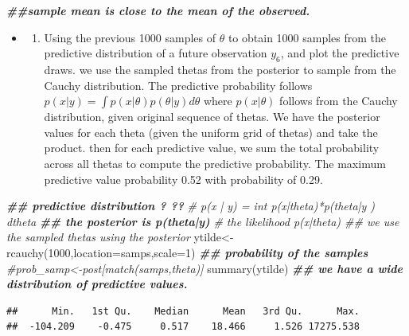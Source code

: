\documentclass[
]{book}
\newenvironment{Shaded}{\begin{snugshade}}{\end{snugshade}}
\newcommand{\AttributeTok}[1]{\textcolor[rgb]{0.77,0.63,0.00}{#1}}
\newcommand{\CommentTok}[1]{\textcolor[rgb]{0.56,0.35,0.01}{\textit{#1}}}
\newcommand{\DecValTok}[1]{\textcolor[rgb]{0.00,0.00,0.81}{#1}}
\newcommand{\DocumentationTok}[1]{\textcolor[rgb]{0.56,0.35,0.01}{\textbf{\textit{#1}}}}
\newcommand{\FunctionTok}[1]{\textcolor[rgb]{0.00,0.00,0.00}{#1}}
\newcommand{\NormalTok}[1]{#1}
\newcommand{\OtherTok}[1]{\textcolor[rgb]{0.56,0.35,0.01}{#1}}
\providecommand{\tightlist}{%
  \setlength{\itemsep}{0pt}\setlength{\parskip}{0pt}}
\theoremstyle{definition}
\theoremstyle{definition}
\theoremstyle{definition}
\theoremstyle{definition}
\theoremstyle{remark}
\begin{document}
\begin{Shaded}
\begin{Highlighting}[]
  \DocumentationTok{\#\#sample mean is close to the mean of the observed.}
\end{Highlighting}
\end{Shaded}

\begin{itemize}
\item
  \begin{enumerate}
  \def\labelenumi{(\alph{enumi})}
  \setcounter{enumi}{2}
  \tightlist
  \item
    Using the previous 1000 samples of \(\theta\) to obtain 1000 samples from the predictive distribution of a future observation \(y_6\), and plot the predictive draws.
    we use the sampled thetas from the posterior to sample from the Cauchy distribution. The predictive probability follows \(p(x|y) =\int p(x|\theta)p(\theta|y)d\theta\) where \(p(x|\theta)\) follows from the Cauchy distribution, given original sequence of thetas. We have the posterior values for each theta (given the uniform grid of thetas) and take the product. then for each predictive value, we sum the total probability across all thetas to compute the predictive probability. The maximum predictive value probability 0.52 with probability of 0.29.
  \end{enumerate}
\end{itemize}

\begin{Shaded}
\begin{Highlighting}[]
\DocumentationTok{\#\# predictive distribution ? ?? }
 \CommentTok{\# p(x | y) = int p(x|theta)*p(theta|y ) dtheta}
\DocumentationTok{\#\# the posterior is p(theta|y) }
 \CommentTok{\# the likelihood p(x|theta)  \#\# we use the sampled thetas using the posterior}
\NormalTok{ ytilde}\OtherTok{\textless{}{-}}\FunctionTok{rcauchy}\NormalTok{(}\DecValTok{1000}\NormalTok{,}\AttributeTok{location=}\NormalTok{samps,}\AttributeTok{scale=}\DecValTok{1}\NormalTok{) }
 \DocumentationTok{\#\# probability of the samples }
 \CommentTok{\#prob\_samp\textless{}{-}post[match(samps,theta)]}
  \FunctionTok{summary}\NormalTok{(ytilde) }\DocumentationTok{\#\# we have a wide distribution of predictive values.}
\end{Highlighting}
\end{Shaded}

\begin{verbatim}
##      Min.   1st Qu.    Median      Mean   3rd Qu.      Max. 
##  -104.209    -0.475     0.517    18.466     1.526 17275.538
\end{verbatim}
\end{document}
